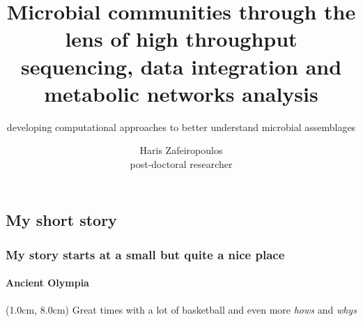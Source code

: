 \documentclass{beamer}
\title{
   Microbial communities through the lens of high throughput sequencing, data integration and metabolic networks analysis
}
\subtitle{
   developing computational approaches to better understand 
   microbial assemblages
}
\author{
   Haris Zafeiropoulos \\ 
   \scriptsize post-doctoral researcher
}
\begin{document}
   \shorthandoff{-}
   \frame[c]{
      \maketitle
   }

   


   \begin{darkframes}
      \section{My short story}
   \end{darkframes}

   \begin{frame}

      \frametitle{
         My story starts at a small but quite a nice place
         }
      \framesubtitle{Ancient Olympia}


      \begin{textblock*}{10cm}(1.0cm, 8.0cm)
         \small Great times with a lot of basketball and even more \textit{hows} and \textit{whys}
      \end{textblock*}

   \end{frame}
\end{document}

